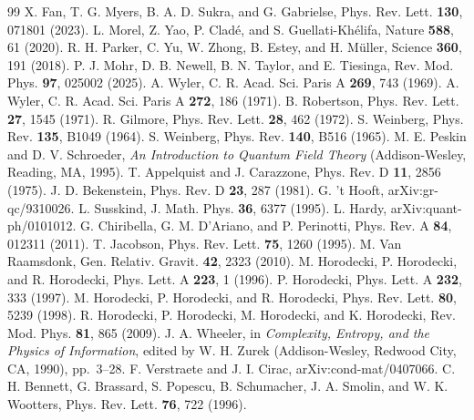 \documentclass[aps,prl,reprint,superscriptaddress,longbibliography,nofootinbib,floatfix]{revtex4-2}
\theoremstyle{definition}
\begin{document}
\begin{thebibliography}{99}
 X. Fan, T. G. Myers, B. A. D. Sukra, and G. Gabrielse, Phys. Rev. Lett. \textbf{130}, 071801 (2023).
 L. Morel, Z. Yao, P. Clad\'{e}, and S. Guellati-Kh\'{e}lifa, Nature \textbf{588}, 61 (2020).
 R. H. Parker, C. Yu, W. Zhong, B. Estey, and H. M\"{u}ller, Science \textbf{360}, 191 (2018).
 P. J. Mohr, D. B. Newell, B. N. Taylor, and E. Tiesinga, Rev. Mod. Phys. \textbf{97}, 025002 (2025).
 A. Wyler, C. R. Acad. Sci. Paris A \textbf{269}, 743 (1969).
 A. Wyler, C. R. Acad. Sci. Paris A \textbf{272}, 186 (1971).
 B. Robertson, Phys. Rev. Lett. \textbf{27}, 1545 (1971).
 R. Gilmore, Phys. Rev. Lett. \textbf{28}, 462 (1972).
 S. Weinberg, Phys. Rev. \textbf{135}, B1049 (1964).
 S. Weinberg, Phys. Rev. \textbf{140}, B516 (1965).
 M. E. Peskin and D. V. Schroeder, \textit{An Introduction to Quantum Field Theory} (Addison-Wesley, Reading, MA, 1995).
 T. Appelquist and J. Carazzone, Phys. Rev. D \textbf{11}, 2856 (1975).
 J. D. Bekenstein, Phys. Rev. D \textbf{23}, 287 (1981).
 G. 't Hooft, arXiv:gr-qc/9310026.
 L. Susskind, J. Math. Phys. \textbf{36}, 6377 (1995).
 L. Hardy, arXiv:quant-ph/0101012.
 G. Chiribella, G. M. D'Ariano, and P. Perinotti, Phys. Rev. A \textbf{84}, 012311 (2011).
 T. Jacobson, Phys. Rev. Lett. \textbf{75}, 1260 (1995).
 M. Van Raamsdonk, Gen. Relativ. Gravit. \textbf{42}, 2323 (2010).
 M. Horodecki, P. Horodecki, and R. Horodecki, Phys. Lett. A \textbf{223}, 1 (1996).
 P. Horodecki, Phys. Lett. A \textbf{232}, 333 (1997).
 M. Horodecki, P. Horodecki, and R. Horodecki, Phys. Rev. Lett. \textbf{80}, 5239 (1998).
 R. Horodecki, P. Horodecki, M. Horodecki, and K. Horodecki, Rev. Mod. Phys. \textbf{81}, 865 (2009).
 J. A. Wheeler, in \textit{Complexity, Entropy, and the Physics of Information}, edited by W. H. Zurek (Addison-Wesley, Redwood City, CA, 1990), pp.~3--28.
 F. Verstraete and J. I. Cirac, arXiv:cond-mat/0407066.
 C. H. Bennett, G. Brassard, S. Popescu, B. Schumacher, J. A. Smolin, and W. K. Wootters, Phys. Rev. Lett. \textbf{76}, 722 (1996).

\end{thebibliography}
\end{document}
